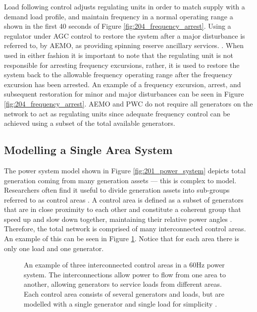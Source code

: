 \newpage

Load following control adjusts regulating units in order to match supply with a demand load profile, and maintain frequency in a normal operating range a shown in the first 40 seconds of Figure \ref{fig:204_frequency_arrest}. Using a regulator under AGC control to restore the system after a major disturbance is referred to, by AEMO, as providing spinning reserve ancillary services. \cite{AEMOancilliaryserv}. When used in either fashion it is important to note that the regulating unit is not responsible for arresting frequency excursions, rather, it is used to restore the system back to the allowable frequency operating range after the frequency excursion has been arrested. An example of a frequency excursion, arrest, and subsequent restoration for minor and major disturbances can be seen in Figure \ref{fig:204_frequency_arrest}. AEMO and PWC do not require all generators on the network to act as regulating units since adequate frequency control can be achieved using a subset of the total available generators.


\subsection{Modelling a Single Area System}
The power system model shown in Figure \ref{fig:201_power_system} depicts total generation coming from many generation assets --- this is complex to model. Researchers often find it useful to divide generation assets into sub-groups referred to as control areas \cite{Kothari2011}. A control area is defined as a subset of generators that are in close proximity to each other and constitute a coherent group that speed up and slow down together, maintaining their relative power angles \cite{Kothari2011}. Therefore, the total network is comprised of many interconnected control areas. An example of this can be seen in Figure \ref{fig:205_multiple_area_system}. Notice that for each area there is only one load and one generator.
\begin{figure}[ht]
	\centering
	\resizebox{12cm}{!}{}
	\caption[Multiple area power system]{An example of three interconnected control areas in a 60$\si{\hertz}$ power system. The interconnections allow power to flow from one area to another, allowing generators to service loads from different areas. Each control area consists of several generators and loads, but are modelled with a single generator and single load for simplicity \cite{Grainger1994}.}
	\label{fig:205_multiple_area_system}
\end{figure}

